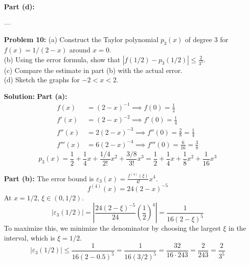 \documentclass[11pt, letterpaper]{article}
\theoremstyle{definition}
\theoremstyle{remark}
\begin{document}
\textbf{Part (d):}
\begin{center}
\end{center}

---

\textbf{Problem 10:} 
(a) Construct the Taylor polynomial $p_3(x)$ of degree 3 for $f(x) = 1/(2-x)$ around $x = 0$. \\
(b) Using the error formula, show that $|f(1/2) - p_3(1/2)| \le \frac{2}{3^5}$. \\
(c) Compare the estimate in part (b) with the actual error. \\
(d) Sketch the graphs for $-2 < x < 2$.

\textbf{Solution:}
\textbf{Part (a):}
\begin{align*}
    f(x) &= (2-x)^{-1} \implies f(0) = \frac{1}{2} \\
    f'(x) &= (2-x)^{-2} \implies f'(0) = \frac{1}{4} \\
    f''(x) &= 2(2-x)^{-3} \implies f''(0) = \frac{2}{8} = \frac{1}{4} \\
    f'''(x) &= 6(2-x)^{-4} \implies f'''(0) = \frac{6}{16} = \frac{3}{8}
\end{align*}
\[ p_3(x) = \frac{1}{2} + \frac{1}{4}x + \frac{1/4}{2!}x^2 + \frac{3/8}{3!}x^3 = \frac{1}{2} + \frac{1}{4}x + \frac{1}{8}x^2 + \frac{1}{16}x^3 \]

\textbf{Part (b):}
The error bound is $\varepsilon_3(x) = \frac{f^{(4)}(\xi)}{4!}x^4$.
\[ f^{(4)}(x) = 24(2-x)^{-5} \]
At $x = 1/2$, $\xi \in (0, 1/2)$.
\[ |\varepsilon_3(1/2)| = \left| \frac{24(2-\xi)^{-5}}{24} \left(\frac{1}{2}\right)^4 \right| = \frac{1}{16(2-\xi)^5} \]
To maximize this, we minimize the denominator by choosing the largest $\xi$ in the interval, which is $\xi = 1/2$.
\[ |\varepsilon_3(1/2)| \le \frac{1}{16(2 - 0.5)^5} = \frac{1}{16(3/2)^5} = \frac{32}{16 \cdot 243} = \frac{2}{243} = \frac{2}{3^5} \]
\end{document}
